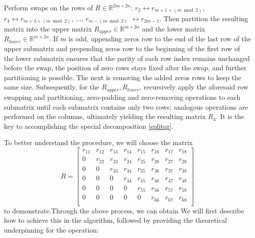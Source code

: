 \documentclass[12pt]{article}
\begin{document}
{\color{red}Perform swaps on the rows of $R\in \mathbb{R}^{2m \times 2n}$: $r_2\leftrightarrow r_{m +1 + (m \bmod 2)}$, $r_4\leftrightarrow r_{m+3+(m \bmod 2)}$, $\dots$, $r_{m - (m \bmod 2)}$ $ \leftrightarrow r_{2m-1}$. Then partition the resulting matrix into the upper matrix $R_{upper}\in \mathbb{R}^{m \times 2n}$ and the lower matrix $R_{lower}\in \mathbb{R}^{m \times 2n}.$ If $m$ is odd, appending zeros row to the end of the last row of the upper submatrix and prepending zeros row to the beginning of the first row of the lower submatrix ensures that the parity of each row index remains unchanged before the swap, the position of zero rows stays fixed after the swap, and further partitioning is possible. The next is removing the added zeros rows to keep the same size. Subsequently, for the $R_{upper}, R_{lower}$, recursively apply the aforesaid row swapping and partitioning, zero-padding and zero-removing operations to each submatrix until each submatrix contains only two rows; analogous operations are performed on the columns, ultimately yielding the resulting matrix $R_4$.}
It is the key to accomplishing the special decomposition \eqref{splitqr}.

To better understand the procedure, we will choose the matrix 
\[R= \begin{bmatrix}
 r_{11} & r_{12} & r_{13} & r_{14} & r_{15} & r_{16} & r_{17} & r_{18}\\
 0      & r_{22} & r_{23} & r_{24} & r_{25} & r_{26} & r_{27} & r_{28}\\
 0      & 0      & r_{33} & r_{34} & r_{35} & r_{36} & r_{37} & r_{38}\\
 0      & 0      & 0      & r_{44} & r_{45} & r_{46} & r_{47} & r_{48}\\
 0      & 0      & 0      & 0      & r_{55} & r_{56} & r_{57} & r_{58}\\
 0      & 0      & 0      & 0      & 0      & r_{66} & r_{67} & r_{68}\\
\end{bmatrix}
\]
to demonstrate.Through the above process, we can obtain
\iffalse
We will first describe how to achieve this in the algorithm, followed by providing the theoretical underpinning for the operation:
\end{document}
